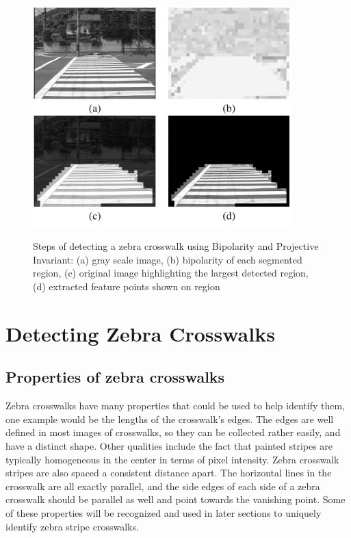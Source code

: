 \documentclass[12pt]{ucthesis}
\newcommand{\captionfonts}{\small\bf\ssp}
\begin{document}
\begin{figure}[t]
\begin{center}
\includegraphics[width=10cm]{BipolarCrosswalk.png}
\captionfonts
\caption[Bipolarity and Projective Invariant detection example]{Steps of detecting a zebra crosswalk using Bipolarity and Projective Invariant: (a) gray scale image, (b) bipolarity of each segmented region, (c) original image highlighting the largest detected region, (d) extracted feature points shown on region}
\label{fig:BipolarCrosswalk}
\end{center}
\end{figure}




\chapter{Detecting Zebra Crosswalks}

\section{Properties of zebra crosswalks}

Zebra crosswalks have many properties that could be used to help identify them, one example would be the lengths of the crosswalk's edges. The edges are well defined in most images of crosswalks, so they can be collected rather easily, and have a distinct shape. Other qualities include the fact that painted stripes are typically homogeneous in the center in terms of pixel intensity. Zebra crosswalk stripes are also spaced a consistent distance apart. The horizontal lines in the crosswalk are all exactly parallel, and the side edges of each side of a zebra crosswalk should be parallel as well and point towards the vanishing point. Some of these properties will be recognized and used in later sections to uniquely identify zebra stripe crosswalks. 
\end{document}
